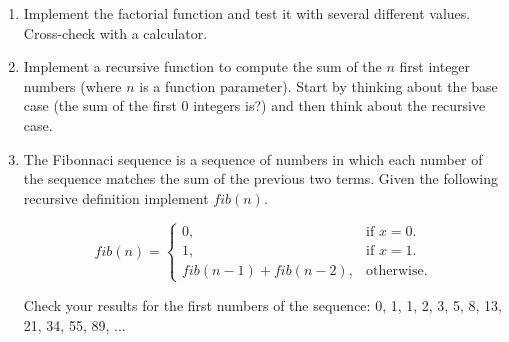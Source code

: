\begin{enumerate}

\item Implement the factorial function and test it with several different values. Cross-check with a calculator.

\item Implement a recursive function to compute the sum of the $n$ first integer numbers (where $n$ is a function parameter). Start by thinking about the base case (the sum of the first 0 integers is?) and then think about the recursive case.

\item The Fibonnaci sequence is a sequence of numbers in which each number of the sequence matches the sum of the previous two terms. Given the following recursive definition implement $fib(n)$.

\begin{equation}
fib(n)=\begin{cases}
    0, & \text{if $x=0$}.\\
    1, & \text{if $x=1$}.\\
    fib(n-1) + fib(n-2), & \text{otherwise}.
\end{cases}
\end{equation}

Check your results for the first numbers of the sequence: 0, 1, 1, 2, 3, 5, 8, 13, 21, 34, 55, 89, ...

\end{enumerate}
